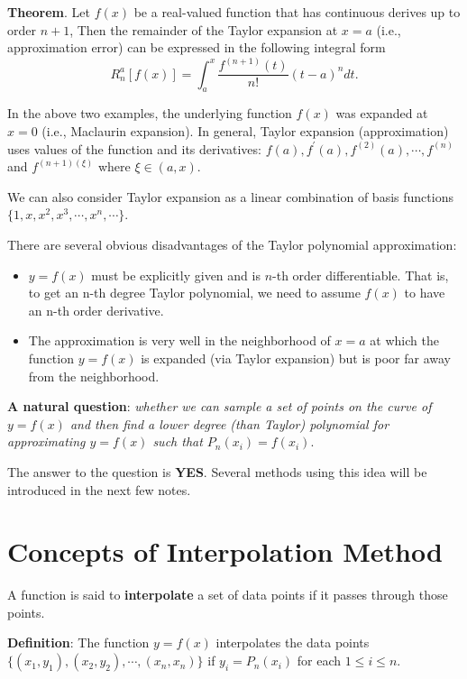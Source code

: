 \documentclass[
]{book}
\begin{document}
\textbf{Theorem}. Let \(f(x)\) be a real-valued function that has continuous derives up to order \(n+1\), Then the remainder of the Taylor expansion at \(x = a\) (i.e., approximation error) can be expressed in the following integral form
\[
R_n^a[f(x)] = \int_a^x \frac{f^{(n+1)}(t)}{n!}(t-a)^n dt.
\]

In the above two examples, the underlying function \(f(x)\) was expanded at \(x = 0\) (i.e., Maclaurin expansion). In general, Taylor expansion (approximation) uses values of the function and its derivatives: \(f(a), f^\prime(a), f^{(2)}(a), \cdots, f^{(n)}\) and \(f^{(n+1)(\xi)}\) where \(\xi \in (a, x)\).

We can also consider Taylor expansion as a linear combination of basis functions \(\{1, x, x^2, x^3, \cdots, x^n, \cdots \}\).

There are several obvious disadvantages of the Taylor polynomial approximation:

\begin{itemize}
\item
  \(y = f(x)\) must be explicitly given and is \(n\)-th order differentiable. That is, to get an n-th degree Taylor polynomial, we need to assume \(f(x)\) to have an n-th order derivative.
\item
  The approximation is very well in the neighborhood of \(x= a\) at which the function \(y = f(x)\) is expanded (via Taylor expansion) but is poor far away from the neighborhood.
\end{itemize}

\textbf{\color{red}A natural question}: \emph{whether we can sample a set of points on the curve of \(y = f(x)\) and then find a lower degree (than Taylor) polynomial for approximating \(y = f(x)\) such that \(P_n(x_i) = f(x_i)\)}.

The answer to the question is \textbf{YES}. Several methods using this idea will be introduced in the next few notes.

\hypertarget{concepts-of-interpolation-method}{%
\section{Concepts of Interpolation Method}\label{concepts-of-interpolation-method}}

A function is said to \textbf{interpolate} a set of data points if it passes through those points.

\textbf{Definition}: The function \(y = f(x)\) interpolates the data points \(\{(x_1, y_1), (x_2, y_2), \cdots, (x_n, x_n)\}\) if \(y_i = P_n(x_i)\) for each \(1 \le i \le n\).
\end{document}
